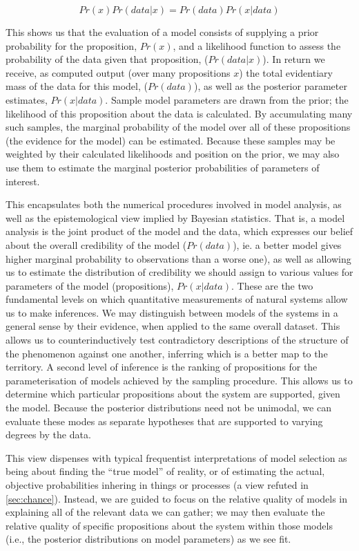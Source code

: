 \[Pr(x)Pr(data|x) = Pr(data)Pr(x|data)\]

This shows us that the evaluation of a model consists of supplying a prior probability for the proposition, $Pr(x)$, and a likelihood function to assess the probability of the data given that proposition, ($Pr(data|x)$). In return we receive, as computed output (over many propositions $x$) the total evidentiary mass of the data for this model, ($Pr(data)$), as well as the posterior parameter estimates, $Pr(x|data)$. Sample model parameters are drawn from the prior; the likelihood of this proposition about the data is calculated. By accumulating many such samples, the marginal probability of the model over all of these propositions (the evidence for the model) can be estimated. Because these samples may be weighted by their calculated likelihoods and position on the prior, we may also use them to estimate the marginal posterior probabilities of parameters of interest. 

This encapsulates both the numerical procedures involved in model analysis, as well as the epistemological view implied by Bayesian statistics. That is, a model analysis is the joint product of the model and the data, which expresses our belief about the overall credibility of the model ($Pr(data)$), ie. a better model gives higher marginal probability to observations than a worse one), as well as allowing us to estimate the distribution of credibility we should assign to various values for parameters of the model (propositions), $Pr(x|data)$. These are the two fundamental levels on which quantitative measurements of natural systems allow us to make inferences. We may distinguish between models of the systems in a general sense by their evidence, when applied to the same overall dataset. This allows us to counterinductively test contradictory descriptions of the structure of the phenomenon against one another, inferring which is a better map to the territory. A second level of inference is the ranking of propositions for the parameterisation of models achieved by the sampling procedure. This allows us to determine which particular propositions about the system are supported, given the model. Because the posterior distributions need not be unimodal, we can evaluate these modes as separate hypotheses that are supported to varying degrees by the data. 

This view dispenses with typical frequentist interpretations of model selection as being about finding the ``true model'' of reality, or of estimating the actual, objective probabilities inhering in things or processes (a view refuted in \autoref{sec:chance}). Instead, we are guided to focus on the relative quality of models in explaining all of the relevant data we can gather; we may then evaluate the relative quality of specific propositions about the system within those models (i.e., the posterior distributions on model parameters) as we see fit.  

